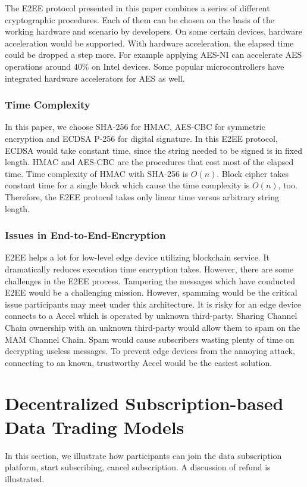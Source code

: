 \documentclass[conference]{IEEEtran}
\begin{document}
The E2EE protocol presented in this paper combines a series of different cryptographic procedures. Each of them can be chosen on the basis of the working hardware and scenario by developers. On some certain devices, hardware acceleration would be supported. With hardware acceleration, the elapsed time could be dropped a step more. For example applying AES-NI can accelerate AES operations around 40\% on Intel devices.\cite{AES-NI-Acceleration} Some popular microcontrollers have integrated hardware accelerators for AES as well.\cite{stm}

\subsubsection{Time Complexity}
In this paper, we choose SHA-256 for HMAC, AES-CBC for symmetric encryption and ECDSA P-256 for digital signature. In this E2EE protocol, ECDSA would take constant time, since the string needed to be signed is in fixed length. HMAC and AES-CBC are the procedures that cost most of the elapsed time. Time complexity of HMAC with SHA-256 is $O(n)$.\cite{hmac_time_complexity} Block cipher takes constant time for a single block which cause the time complexity is $O(n)$, too. Therefore, the E2EE protocol takes only linear time versus arbitrary string length.

\subsubsection{Issues in End-to-End-Encryption}
E2EE helps a lot for low-level edge device utilizing blockchain service. It dramatically reduces execution time encryption takes. However, there are some challenges in the E2EE process. Tampering the messages which have conducted E2EE would be a challenging mission. However, spamming would be the critical issue participants may meet under this architecture. It is risky for an edge device connects to a Accel which is operated by unknown third-party. Sharing Channel Chain ownership with an unknown third-party would allow them to spam on the MAM Channel Chain. Spam would cause subscribers wasting plenty of time on decrypting useless messages. To prevent edge devices from the annoying attack, connecting to an known, trustworthy Accel would be the easiest solution.

\section{Decentralized Subscription-based Data Trading Models}
\label{section:trading_model}
In this section, we illustrate how participants can join the data subscription platform, start subscribing, cancel subscription. A discussion of refund is illustrated.
\end{document}
